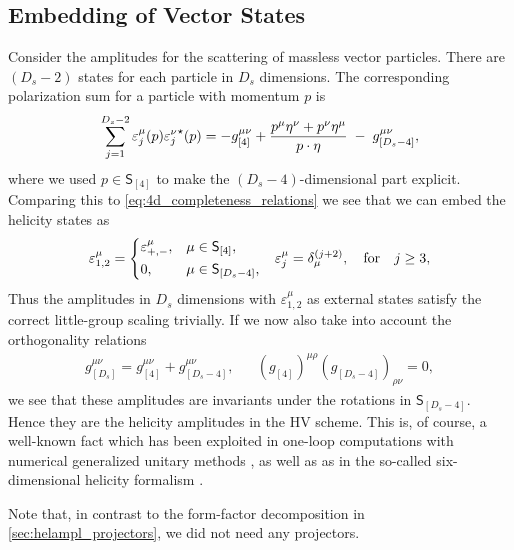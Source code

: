 \subsection{Embedding of Vector States}
\label{sec:embedding_vectors}
Consider the amplitudes for the scattering of massless vector particles.
There are $(D_s - 2)$ states for each particle in $D_s$ dimensions. 
The corresponding polarization sum for a particle with momentum $p$ is 
\begin{equation} \label{eq:vector_pol_sum_ds}
  \sum_{j=1}^{D_s-2} \varepsilon^\mu_j(p){\varepsilon^\nu_j}^{\star{}}(p) = -g_{[4]}^{\mu\nu} + \frac{p^\mu \eta^\nu + p^\nu \eta^\mu}{\sp(p,\eta)} \;-\; g_{[D_s-4]}^{\mu\nu}, 
\end{equation}
where we used $p \in \mathsf{S}_{[4]}$
to make the $(D_s-4)$-dimensional part explicit.
Comparing this to \cref{eq:4d_completeness_relations} we see that we can embed the helicity states as \cite{Kosower:1990ax}
\begin{align} \label{eq:embedding_vectors}
  \varepsilon_{1,2}^\mu =
    \begin{dcases}
      \varepsilon^\mu_{+,-}, & \mu\in \mathsf{S}_{[4]},\\
      0, & \mu\in \mathsf{S}_{[D_s-4]},\\
    \end{dcases}
    &&
  \varepsilon_{j}^\mu = \delta^{(j+2)}_\mu, \qfor j\geq 3,
\end{align}
Thus the amplitudes in $D_s$ dimensions with $\varepsilon_{1,2}^\mu$ as external states satisfy the correct little-group scaling trivially.
If we now also take into account the orthogonality relations 
\begin{align}
  g_{[D_s]}^{\mu\nu} = g^{\mu\nu}_{[4]}+g^{\mu\nu}_{[D_s-4]}, && (g_{[4]})^{\mu\rho}(g_{[D_s-4]})_{\rho\nu} = 0,
\end{align}
we see that these amplitudes are invariants under the rotations in $\mathsf{S}_{[D_s-4]}$.
Hence they are the helicity amplitudes in the HV scheme.
This is, of course, a well-known fact which has been exploited in one-loop computations with numerical generalized
unitary methods \cite{Ellis:2007br,Giele:2008ve}, as well as as 
in the so-called six-dimensional helicity formalism \cite{Bern2011,Cheung:2009dc,Badger:2013gxa,Badger:2017jhb}.

Note that, in contrast to the form-factor decomposition in \cref{sec:helampl_projectors}, we did not need any projectors.

